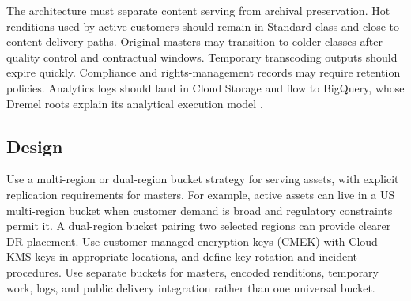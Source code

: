 The architecture must separate content serving from archival preservation. Hot renditions used by active customers should remain in Standard class and close to content delivery paths. Original masters may transition to colder classes after quality control and contractual windows. Temporary transcoding outputs should expire quickly. Compliance and rights-management records may require retention policies. Analytics logs should land in Cloud Storage and flow to BigQuery, whose Dremel roots explain its analytical execution model \cite{melnik2010dremel,googlecloudbigquerydocs}.

\subsection{Design}
Use a multi-region or dual-region bucket strategy for serving assets, with explicit replication requirements for masters. For example, active assets can live in a US multi-region bucket when customer demand is broad and regulatory constraints permit it. A dual-region bucket pairing two selected regions can provide clearer DR placement. Use customer-managed encryption keys (CMEK) with Cloud KMS keys in appropriate locations, and define key rotation and incident procedures. Use separate buckets for masters, encoded renditions, temporary work, logs, and public delivery integration rather than one universal bucket.

